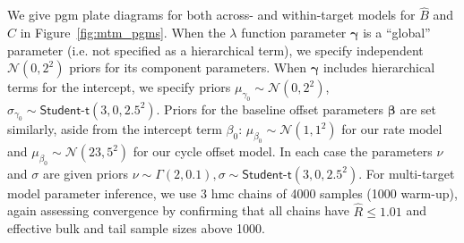 \documentclass[../thesis.tex]{subfiles}
\begin{document}
We give \gls{pgm} plate diagrams for both across- and within-target models for $\hat{B}$ and $\hat{C}$ in Figure~\ref{fig:mtm_pgms}. When the $\lambda$ function parameter $\bm{\gamma}$ is a ``global'' parameter (i.e. not specified as a hierarchical term), we specify independent $\mathcal{N}(0,2^2)$ priors for its component parameters. When $\bm{\gamma}$ includes hierarchical terms for the intercept, we specify priors $\mu_{\gamma_{0}} \sim \mathcal{N}(0, 2^2)$, $\sigma_{\gamma_{0}} \sim \textsf{Student-t}(3, 0, 2.5^2)$. Priors for the baseline offset parameters $\bm{\beta}$ are set similarly, aside from the intercept term $\beta_0$: $\mu_{\beta_0} \sim \mathcal{N}(1, 1^2)$ for our rate model and $\mu_{\beta_0} \sim \mathcal{N}(23, 5^2)$ for our cycle offset model. In each case the parameters $\nu$ and $\sigma$ are given priors $\nu \sim \Gamma (2, 0.1), \sigma \sim \textsf{Student-t}(3, 0, 2.5^2)$.
For multi-target model parameter inference, we use 3 \gls{hmc} chains of 4000 samples (1000 warm-up), again assessing convergence by confirming that all chains have $\hat{R} \leq 1.01$ and effective bulk and tail sample sizes above 1000.
\end{document}
